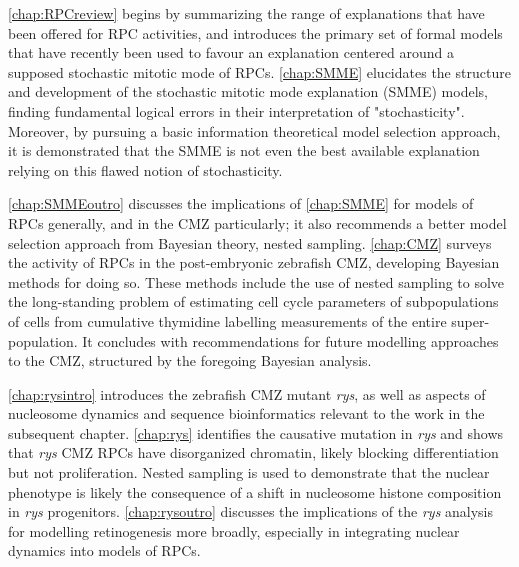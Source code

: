 \autoref{chap:RPCreview} begins by summarizing the range of explanations that have been offered for RPC activities, and introduces the primary set of formal models that have recently been used to favour an explanation centered around a supposed stochastic mitotic mode of RPCs. \autoref{chap:SMME} elucidates the structure and development of the stochastic mitotic mode explanation (SMME) models, finding fundamental logical errors in their interpretation of "stochasticity". Moreover, by pursuing a basic information theoretical model selection approach, it is demonstrated that the SMME is not even the best available explanation relying on this flawed notion of stochasticity.

\autoref{chap:SMMEoutro} discusses the implications of \autoref{chap:SMME} for models of RPCs generally, and in the CMZ particularly; it also recommends a better model selection approach from Bayesian theory, nested sampling. \autoref{chap:CMZ} surveys the activity of RPCs in the post-embryonic zebrafish CMZ, developing Bayesian methods for doing so. These methods include the use of nested sampling to solve the long-standing problem of estimating cell cycle parameters of subpopulations of cells from cumulative thymidine labelling measurements of the entire super-population. It concludes with recommendations for future modelling approaches to the CMZ, structured by the foregoing Bayesian analysis. 

\autoref{chap:rysintro} introduces the zebrafish CMZ mutant \textit{rys}, as well as aspects of nucleosome dynamics and sequence bioinformatics relevant to the work in the subsequent chapter. \autoref{chap:rys} identifies the causative mutation in \textit{rys} and shows that \textit{rys} CMZ RPCs have disorganized chromatin, likely blocking differentiation but not proliferation. Nested sampling is used to demonstrate that the nuclear phenotype is likely the consequence of a shift in nucleosome histone composition in \textit{rys} progenitors. \autoref{chap:rysoutro} discusses the implications of the \textit{rys} analysis for modelling retinogenesis more broadly, especially in integrating nuclear dynamics into models of RPCs.